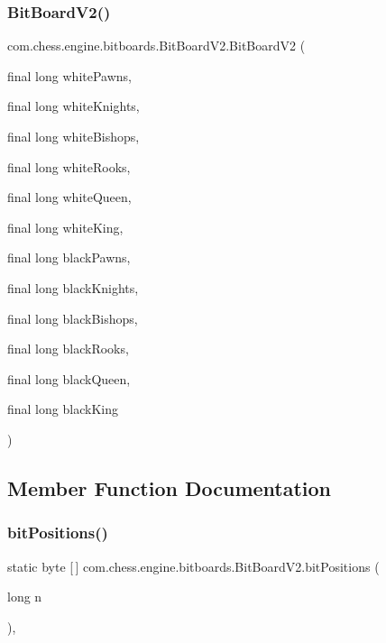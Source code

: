 \subsubsection{\texorpdfstring{BitBoardV2()}{BitBoardV2()}}
{\footnotesize\ttfamily com.\+chess.\+engine.\+bitboards.\+Bit\+Board\+V2.\+Bit\+Board\+V2 (\begin{DoxyParamCaption}\item[{final long}]{white\+Pawns,  }\item[{final long}]{white\+Knights,  }\item[{final long}]{white\+Bishops,  }\item[{final long}]{white\+Rooks,  }\item[{final long}]{white\+Queen,  }\item[{final long}]{white\+King,  }\item[{final long}]{black\+Pawns,  }\item[{final long}]{black\+Knights,  }\item[{final long}]{black\+Bishops,  }\item[{final long}]{black\+Rooks,  }\item[{final long}]{black\+Queen,  }\item[{final long}]{black\+King }\end{DoxyParamCaption})\hspace{0.3cm}{\ttfamily [private]}}



\subsection{Member Function Documentation}
\mbox{\label{classcom_1_1chess_1_1engine_1_1bitboards_1_1_bit_board_v2_ab28101b42557a49a5024143c009845e1}} 
\subsubsection{\texorpdfstring{bitPositions()}{bitPositions()}}
{\footnotesize\ttfamily static byte \mbox{[}$\,$\mbox{]} com.\+chess.\+engine.\+bitboards.\+Bit\+Board\+V2.\+bit\+Positions (\begin{DoxyParamCaption}\item[{long}]{n }\end{DoxyParamCaption})\hspace{0.3cm}{\ttfamily [static]}, {\ttfamily [private]}}


